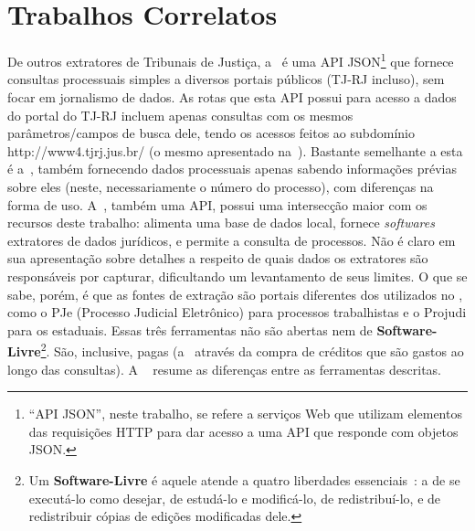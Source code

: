\chapter{Trabalhos Correlatos~\label{chp:related-work}}

De outros extratores de Tribunais de Justiça, a~\cite{plexi-api} é uma API
JSON\footnote{``API JSON'', neste trabalho, se refere a serviços Web que
utilizam elementos das requisições HTTP para dar acesso a uma API que responde
com objetos JSON.} que fornece consultas processuais simples a diversos portais
públicos (TJ-RJ incluso), sem focar em jornalismo de dados. As rotas que esta
API possui para acesso a dados do portal do TJ-RJ incluem apenas consultas com
os mesmos parâmetros/campos de busca dele, tendo os acessos feitos ao
subdomínio http://www4.tjrj.jus.br/ (o mesmo apresentado
na~). Bastante semelhante a esta é a~\cite{intima.ai},
também fornecendo dados processuais apenas sabendo informações prévias sobre
eles (neste, necessariamente o número do processo), com diferenças na forma de
uso. A~\cite{codilo-api}, também uma API, possui uma intersecção maior com os
recursos deste trabalho: alimenta uma base de dados local, fornece
\textit{softwares} extratores de dados jurídicos, e permite a consulta de
processos. Não é claro em sua apresentação sobre detalhes a respeito de quais
dados os extratores são responsáveis por capturar, dificultando um levantamento
de seus limites. O que se sabe, porém, é que as fontes de extração são portais
diferentes dos utilizados no \tjscraper, como o PJe (Processo Judicial
Eletrônico) para processos trabalhistas e o Projudi para os estaduais. Essas
três ferramentas não são abertas nem de \textbf{Software-Livre}\footnote{Um
\textbf{Software-Livre} é aquele atende a quatro liberdades
essenciais~\cite{def:free-software}: a de se executá-lo como desejar, de
estudá-lo e modificá-lo, de redistribuí-lo, e de redistribuir cópias de edições
modificadas dele.}. São, inclusive, pagas (a~\cite{intima.ai} através da compra
de créditos que são gastos ao longo das consultas). A
~ resume as diferenças entre as
ferramentas descritas.


